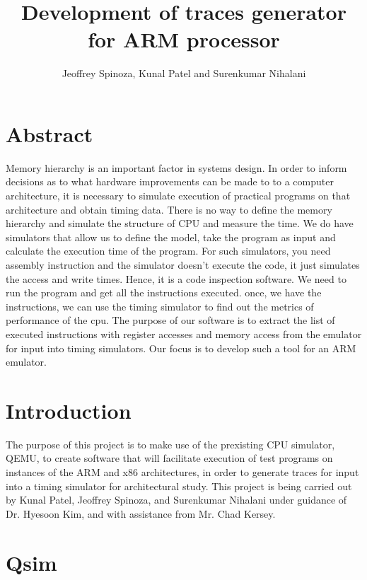 \documentclass[letterpaper,11pt,twocolumn]{article}
\title{Development of traces generator for ARM processor}
\author{Jeoffrey Spinoza, Kunal Patel and Surenkumar Nihalani}
\begin{document}
\maketitle
\section{Abstract}
Memory hierarchy is an important factor in systems design. In order to inform decisions as to what hardware improvements can be made to to a computer architecture, it is necessary to simulate execution of practical programs on that architecture and obtain timing data. There is no way to define the memory hierarchy and simulate the structure of CPU and measure the time. We do have simulators that allow us to define the model, take the program as input and calculate the execution time of the program. For such simulators, you need assembly instruction and the simulator doesn't execute the code, it just simulates the access and write times. Hence, it is a code inspection software. We need to run the program and get all the instructions executed. once, we have the instructions, we can use the timing simulator to find out the metrics of performance of the cpu. The purpose of our software is to extract the list of executed instructions with register accesses and memory access from the emulator for input into timing simulators. Our focus is to develop such a tool for an ARM emulator.
\section{Introduction}
The purpose of this project is to make use of the prexisting CPU simulator, QEMU, to create software that will facilitate execution of test programs on instances of the ARM and x86 architectures, in order to generate traces for input into a timing simulator for architectural study. This project is being carried out by Kunal Patel, Jeoffrey Spinoza, and Surenkumar Nihalani under guidance of Dr. Hyesoon Kim, and with assistance from Mr. Chad Kersey.
\section{Qsim}
\end{document}
